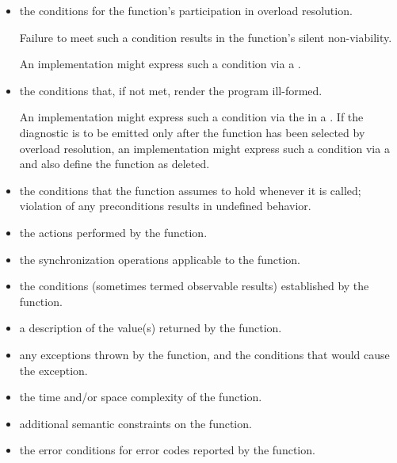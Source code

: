 \begin{itemize}
\item
\constraints
the conditions for the function's participation
in overload resolution.
\begin{note}
Failure to meet such a condition results in the function's silent non-viability.
\end{note}
\begin{example}
An implementation might express such a condition
via a .
\end{example}

\item
\mandates
the conditions that, if not met, render the program ill-formed.
\begin{example}
An implementation might express such a condition
via the 
in a .
If the diagnostic is to be emitted only after the function
has been selected by overload resolution,
an implementation might express such a condition
via a 
and also define the function as deleted.
\end{example}

\item
\expects
the conditions
that the function assumes to hold whenever it is called;
violation of any preconditions results in undefined behavior.

\item
\effects
the actions performed by the function.

\item
\sync
the synchronization operations applicable to the function.

\item
\ensures
the conditions (sometimes termed observable results)
established by the function.

\item
\returns
a description of the value(s) returned by the function.

\item
\throws
any exceptions thrown by the function, and the conditions that would cause the exception.

\item
\complexity
the time and/or space complexity of the function.

\item
\remarks
additional semantic constraints on the function.

\item
\errors
the error conditions for error codes reported by the function.
\end{itemize}


